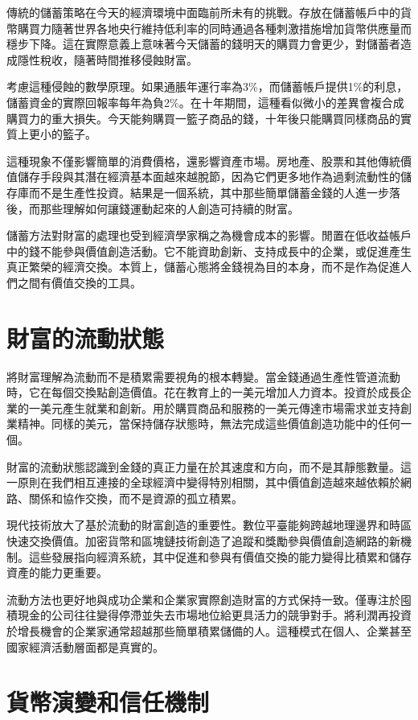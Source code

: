\documentclass[
  Letterpaper,
]{scrbook}
\begin{document}
傳統的儲蓄策略在今天的經濟環境中面臨前所未有的挑戰。存放在儲蓄帳戶中的貨幣購買力隨著世界各地央行維持低利率的同時通過各種刺激措施增加貨幣供應量而穩步下降。這在實際意義上意味著今天儲蓄的錢明天的購買力會更少，對儲蓄者造成隱性稅收，隨著時間推移侵蝕財富。

考慮這種侵蝕的數學原理。如果通脹年運行率為3\%，而儲蓄帳戶提供1\%的利息，儲蓄資金的實際回報率每年為負2\%。在十年期間，這種看似微小的差異會複合成購買力的重大損失。今天能夠購買一籃子商品的錢，十年後只能購買同樣商品的實質上更小的籃子。

這種現象不僅影響簡單的消費價格，還影響資產市場。房地產、股票和其他傳統價值儲存手段與其潛在經濟基本面越來越脫節，因為它們更多地作為過剩流動性的儲存庫而不是生產性投資。結果是一個系統，其中那些簡單儲蓄金錢的人進一步落後，而那些理解如何讓錢運動起來的人創造可持續的財富。

儲蓄方法對財富的處理也受到經濟學家稱之為機會成本的影響。閒置在低收益帳戶中的錢不能參與價值創造活動。它不能資助創新、支持成長中的企業，或促進產生真正繁榮的經濟交換。本質上，儲蓄心態將金錢視為目的本身，而不是作為促進人們之間有價值交換的工具。

\section{財富的流動狀態}\label{ux8ca1ux5bccux7684ux6d41ux52d5ux72c0ux614b}

將財富理解為流動而不是積累需要視角的根本轉變。當金錢通過生產性管道流動時，它在每個交換點創造價值。花在教育上的一美元增加人力資本。投資於成長企業的一美元產生就業和創新。用於購買商品和服務的一美元傳達市場需求並支持創業精神。同樣的美元，當保持儲存狀態時，無法完成這些價值創造功能中的任何一個。

財富的流動狀態認識到金錢的真正力量在於其速度和方向，而不是其靜態數量。這一原則在我們相互連接的全球經濟中變得特別相關，其中價值創造越來越依賴於網路、關係和協作交換，而不是資源的孤立積累。

現代技術放大了基於流動的財富創造的重要性。數位平臺能夠跨越地理邊界和時區快速交換價值。加密貨幣和區塊鏈技術創造了追蹤和獎勵參與價值創造網路的新機制。這些發展指向經濟系統，其中促進和參與有價值交換的能力變得比積累和儲存資產的能力更重要。

流動方法也更好地與成功企業和企業家實際創造財富的方式保持一致。僅專注於囤積現金的公司往往變得停滯並失去市場地位給更具活力的競爭對手。將利潤再投資於增長機會的企業家通常超越那些簡單積累儲備的人。這種模式在個人、企業甚至國家經濟活動層面都是真實的。

\section{貨幣演變和信任機制}\label{ux8ca8ux5e63ux6f14ux8b8aux548cux4fe1ux4efbux6a5fux5236}
\end{document}
